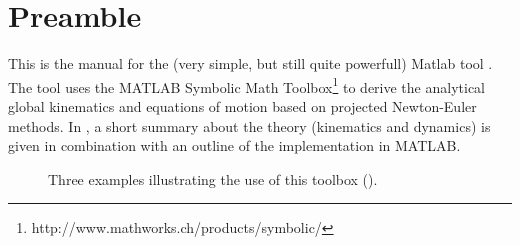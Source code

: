 










\chapter*{Preamble}


This is the manual for the (very simple, but still quite powerfull) Matlab tool \proneu.  The tool uses the MATLAB Symbolic Math Toolbox\footnote{http://www.mathworks.ch/products/symbolic/} to derive the analytical global kinematics and equations of motion based on projected Newton-Euler methods.  In , a short summary about the theory (kinematics and dynamics) is given in combination with an outline of the implementation in MATLAB. \\ 
\begin{figure}[H]
	\centering
	\caption{Three examples illustrating the use of this toolbox ().}
	\label{fig:exCol}
\end{figure}


